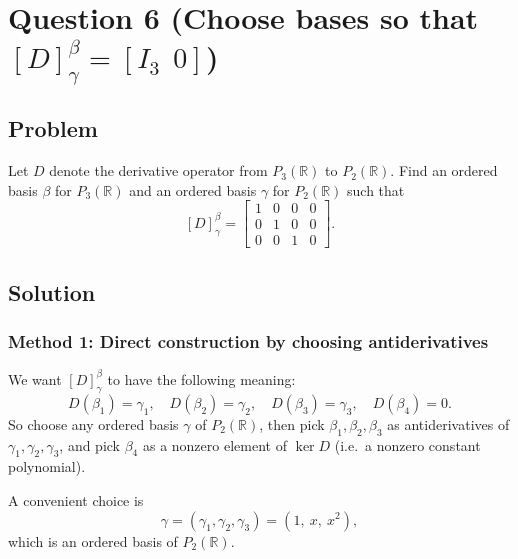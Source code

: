 \documentclass[12pt]{article}
\newcommand{\R}{\mathbb{R}}
\begin{document}
\newpage
\section{Question 6 (Choose bases so that $[D]_\gamma^\beta = [I_3\ \ 0]$)}
\subsection{Problem}
Let $D$ denote the derivative operator from $P_3(\R)$ to $P_2(\R)$.
Find an ordered basis $\beta$ for $P_3(\R)$ and an ordered basis $\gamma$ for $P_2(\R)$ such that
\[
[D]_{\gamma}^{\beta} =
\begin{bmatrix}
1&0&0&0\\
0&1&0&0\\
0&0&1&0
\end{bmatrix}.
\]

\subsection{Solution}

\subsubsection{Method 1: Direct construction by choosing antiderivatives}
We want $[D]_{\gamma}^{\beta}$ to have the following meaning:
\[
D(\beta_1)=\gamma_1,\quad D(\beta_2)=\gamma_2,\quad D(\beta_3)=\gamma_3,\quad D(\beta_4)=0.
\]
So choose any ordered basis $\gamma$ of $P_2(\R)$, then pick $\beta_1,\beta_2,\beta_3$ as antiderivatives of $\gamma_1,\gamma_2,\gamma_3$,
and pick $\beta_4$ as a nonzero element of $\ker D$ (i.e.\ a nonzero constant polynomial).

A convenient choice is
\[
\gamma=(\gamma_1,\gamma_2,\gamma_3)=(1,\ x,\ x^2),
\]
which is an ordered basis of $P_2(\R)$.
\end{document}
